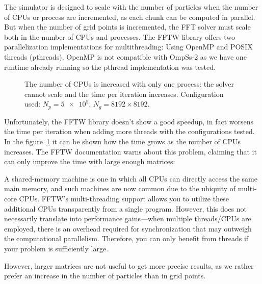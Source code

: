 The simulator is designed to scale with the number of particles when the number 
of CPUs or process are incremented, as each chunk can be computed in parallel.  
But when the number of grid points is incremented, the FFT solver must scale 
both in the number of CPUs and processes. The FFTW library offers two 
parallelization implementations for multithreading: Using OpenMP and POSIX 
threads (pthreads). OpenMP is not compatible with OmpSs-2 as we have one runtime 
already running so the pthread implementation was tested.
%
\begin{figure}[h]
	\centering
	\caption{The number of CPUs is increased with only one process: the solver 
	cannot scale and the time per iteration increases. Configuration used: $N_p = 
	\num{5e5}$, $N_g=8192\times8192$.}
	\label{fig:fftw-time}
\end{figure}
%
Unfortunately, the FFTW library doesn't show a good speedup, in fact worsens the 
time per iteration when adding more threads with the configurations tested. In 
the figure~\ref{fig:fftw-time} it can be shown how the time grows as the number 
of CPUs increases.
%
The FFTW documentation warns about this problem, claiming that it can only 
improve the time with large enough matrices:
%
\begin{displayquote}
A shared-memory machine is one in which all CPUs can directly access the same 
main memory, and such machines are now common due to the ubiquity of multi-core 
CPUs. FFTW’s multi-threading support allows you to utilize these additional CPUs 
transparently from a single program. However, this does not necessarily 
translate into performance gains---when multiple threads/CPUs are employed, 
there is an overhead required for synchronization that may outweigh the 
computational parallelism. Therefore, you can only benefit from threads if your 
problem is sufficiently large.
\end{displayquote}
%
However, larger matrices are not useful to get more precise results, as we 
rather prefer an increase in the number of particles than in grid points.


